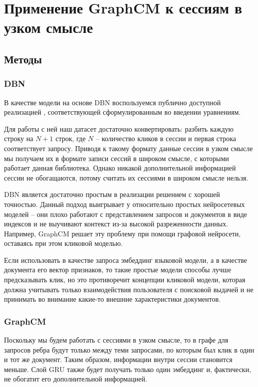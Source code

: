\documentclass[diploma]{nanolab2015}
\begin{document}
\section{Применение GraphCM к сессиям в узком смысле}
\subsection{Методы}
\subsubsection{DBN}
В качестве модели на основе DBN воспользуемся публично доступной реализацией \cite{dbngithub}, соответствующей сформулированным во введении уравнениям.

Для работы с ней наш датасет достаточно конвертировать: разбить каждую строку на $N+1$ строк, где $N$ -- количество кликов в сессии и первая строка соответствует запросу. Приводя к такому формату данные сессии в узком смысле мы получаем их в формате записи сессий в широком смысле, с которыми работает данная библиотека. Однако никакой дополнительной информацией сессии не обогащаются, потому считать их сессиями в широком смысле нельзя.

DBN является достаточно простым в реализации решением с хорошей точностью. Данный подход выигрывает у относительно простых нейросетевых моделей -- они плохо работают с представлением запросов и документов в виде индексов и не выучивают контекст из-за высокой разреженности данных. Например, GraphCM решает эту проблему при помощи графовой нейросети, оставаясь при этом кликовой моделью.

Если использовать в качестве запроса эмбеддинг языковой модели, а в качестве документа его вектор признаков, то такие простые модели способы лучше предсказывать клик, но это противоречит концепции кликовой модели, которая должна учитывать только взаимодействия пользователя с поисковой выдачей и не принимать во внимание какие-то внешние характеристики документов.

\subsubsection{GraphCM}
Поскольку мы будем работать с сессиями в узком смысле, то в графе для запросов ребра будут только между теми запросами, по которым был клик в один и тот же документ. Таким образом, информации внутри сессии становится меньше. Слой GRU также будет получать только один эмбеддинг и, фактически, не обогатит его дополнительной информацией.
\end{document}
